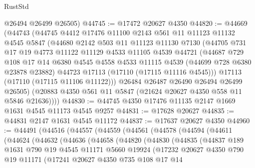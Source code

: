 \begin{lexlean}{RustStd}
\begin{coremodule}
      @26494
      @26499
      @26505)
@44745 := @17472 @20627 @4350
@44820 := @44669
    (@44743
      (@44745
        @4412
        @17476
        @11100
        @2143
        @561
        @11
        @11123
        @11132
        @4545
        @5847
        (@44680
          @2142
          @503
          @11
          @11123
          @11130
          @7130
          (@44705
            @731
            @17
            @19
            @4773
            @11122
            @11129
            @4533
            @11105
            @4539
            @44721
            (@44687
              @729
              @108
              @17
              @14
              @6380
              @4545
              @4558
              @4533
              @11115
              @4539
              (@44699 @728 @6380 @23878 @23882)
              @44723
              @17113
              (@17110 (@17115 @11116 @4545)))
            @17113
            (@17110 (@17115 @11106 @11122)))
          @26484
          @26487
          @26490
          @26494
          @26499
          @26505)
        (@20883 @4350 @561 @11 @5847 (@21624 @20627 @4350 @558 @11 @5846 @21636))))
@44830 := @44745 @4350 @17476 @11135 @2147 @1669 @1631 @4545 @11173 @4545 @9257
@44831 := @17628 @20627
@44835 := @44831 @2147 @1631 @4545 @11172
@44837 := @17637 @20627 @4350
@44960 := @44491
    (@44516
      (@44557
        (@44559
          (@44561
            (@44578
              (@44594
                (@44611
                  (@44624
                    (@44632
                      (@44636
                        (@44658
                          (@44820
                            (@44830
                              (@44835
                                (@44837
                                  @189
                                  @1631
                                  @790
                                  @19
                                  @4545
                                  @11171
                                  @5660
                                  @19924
                                  (@17232
                                    @20627
                                    @4350
                                    @790
                                    @19
                                    @11171
                                    (@17241
                                      @20627
                                      @4350
                                      @735
                                      @108
                                      @17
                                      @14

\end{coremodule}
\end{lexlean}
